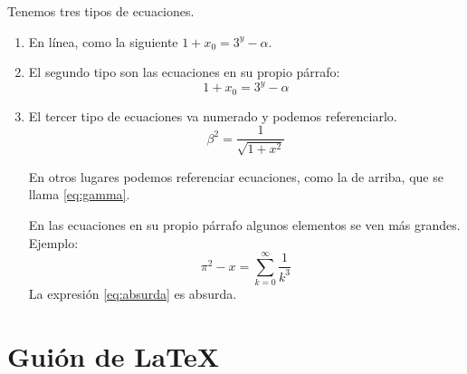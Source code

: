 \documentclass[a4,12pt]{article}
\begin{document}
Tenemos tres tipos de ecuaciones.
\begin{enumerate}
\item En línea, como la siguiente $1+x_0=3^y-\alpha$.
\item El segundo tipo son las ecuaciones en su propio párrafo: $$1+x_0=3^y-\alpha$$
\item El tercer tipo de ecuaciones va numerado y podemos referenciarlo.
\begin{equation}\label{eq:gamma}
\beta^2=\frac{1}{\sqrt{1+x^2}}
\end{equation}

En otros lugares podemos referenciar ecuaciones, como la de arriba, que se llama \ref{eq:gamma}.

En las ecuaciones en su propio párrafo algunos elementos se ven más grandes. Ejemplo:
\begin{equation}\label{eq:absurda}
\pi^2-x=\sum_{k=0}^\infty \frac{1}{k^3}
\end{equation}
La expresión \ref{eq:absurda} es absurda.

\end{enumerate}

\section{Guión de \LaTeX}
\end{document}
